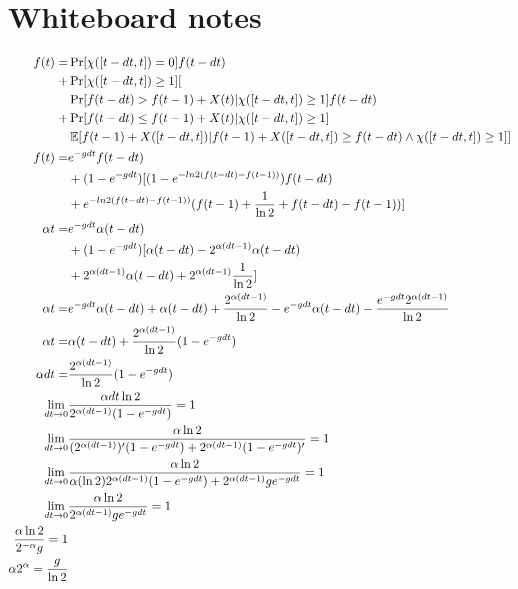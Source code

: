 \section{Whiteboard notes}
\begin{align*}
  f(t) =& \Pr[\chi([t - dt, t]) = 0] f(t - dt)\\
      + &\Pr[\chi([t - dt, t]) \geq 1] [\\
        &\Pr[f(t - dt) > f(t - 1) + X(t) | \chi([t - dt, t]) \geq 1] f(t - dt)\\
      + &\Pr[f(t - dt) \leq f(t - 1) + X(t) | \chi([t - dt, t]) \geq 1]\\
        &\mathop{{}\mathbb{E}}[f(t - 1) + X([t - dt, t]) | f(t - 1) + X([t - dt, t]) \geq f(t - dt) \land \chi([t - dt, t]) \geq 1]]\\
  f(t) =& e^{-g dt} f(t - dt)\\&+ (1 - e^{-g dt}) [(1 - e^{-ln2 (f(t - dt) - f(t - 1))}) f(t - dt)\\ &+ e^{-ln2 (f(t - dt) - f(t - 1))} (f(t - 1) + \frac{1}{\ln2} + f(t - dt) - f(t - 1))]\\
  \alpha t =& e^{-g dt} \alpha(t - dt)\\ &+ (1 - e^{-g dt}) [\alpha(t - dt) - 2^{\alpha (dt - 1)} \alpha (t - dt)\\ &+ 2^{\alpha(dt - 1)} \alpha (t - dt) + 2^{\alpha(dt - 1)} \frac{1}{\ln2}]\\
  \alpha t =& e^{-g dt} \alpha (t - dt) + \alpha (t - dt) + \frac{2^{\alpha (dt - 1)}}{\ln2} - e^{-g dt} \alpha (t - dt) - \frac{e^{-g dt} 2^{\alpha (dt - 1)}}{\ln2}\\
  \alpha t =& \alpha(t - dt) + \frac{2^{\alpha (dt - 1)}}{\ln2} (1 - e^{-g dt})\\
  \alpha dt = & \frac{2^{\alpha (dt - 1)}}{\ln2} (1 - e^{-g dt})\\
  \lim_{dt \to 0}& \frac{\alpha dt \ln2}{2^{\alpha (dt - 1)} (1 - e^{-g dt})} = 1\\
  \lim_{dt \to 0}& \frac{\alpha \ln2}{(2^{\alpha(dt - 1)})'(1 - e^{-g dt}) + 2^{\alpha(dt - 1)} (1 - e^{-g dt})'} = 1\\
  \lim_{dt \to 0}& \frac{\alpha \ln2}{\alpha (\ln2) 2^{\alpha(dt - 1)} (1 - e^{-g dt}) + 2^{\alpha(dt - 1)} g e^{-g dt}} = 1\\
  \lim_{dt \to 0}& \frac{\alpha \ln2}{2^{\alpha(dt - 1)} g e^{-g dt}} = 1\\
  \frac{\alpha \ln2}{2^{-\alpha} g} = 1\\
  \alpha 2^\alpha = \frac{g}{\ln2}
\end{align*}